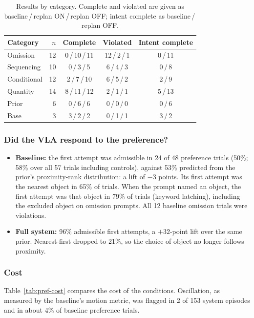 \begin{table}[t]
  \centering
  \caption{Results by category. Complete and violated are given as
    baseline\,/\,replan ON\,/\,replan OFF; intent complete as baseline\,/\,replan OFF.}
  \label{tab:pref-category}
  \begin{tabular}{lrccc}
    \toprule
    Category & $n$ & Complete & Violated & Intent complete \\
    \midrule
    Omission    & 12 & 0\,/\,10\,/\,11 & 12\,/\,2\,/\,1 & 0\,/\,11 \\
    Sequencing  & 10 & 0\,/\,3\,/\,5   & 6\,/\,4\,/\,3  & 0\,/\,8 \\
    Conditional & 12 & 2\,/\,7\,/\,10  & 6\,/\,5\,/\,2  & 2\,/\,9 \\
    Quantity    & 14 & 8\,/\,11\,/\,12 & 2\,/\,1\,/\,1  & 5\,/\,13 \\
    Prior       &  6 & 0\,/\,6\,/\,6   & 0\,/\,0\,/\,0  & 0\,/\,6 \\
    Base        &  3 & 3\,/\,2\,/\,2   & 0\,/\,1\,/\,1  & 3\,/\,2 \\
    \bottomrule
  \end{tabular}
\end{table}

\subsubsection{Did the VLA respond to the preference?}
\begin{itemize}
  \item \textbf{Baseline:} the first attempt was admissible in 24 of 48 preference
    trials (50\%; 58\% over all 57 trials including controls), against 53\% predicted from the prior's proximity-rank distribution: a lift of
    $-3$ points. Its first attempt was the nearest object in 65\% of trials. When the
    prompt named an object, the first attempt was that object in 79\% of trials (keyword
    latching), including the excluded object on omission prompts. All 12 baseline
    omission trials were violations.
  \item \textbf{Full system:} 96\% admissible first attempts, a $+32$-point lift over the
    same prior. Nearest-first dropped to 21\%, so the choice of object no longer follows
    proximity.
\end{itemize}

\subsubsection{Cost}
Table~\ref{tab:pref-cost} compares the cost of the conditions. Oscillation, as measured
by the baseline's motion metric, was flagged in 2 of 153 system episodes and in about 4\%
of baseline preference trials.

